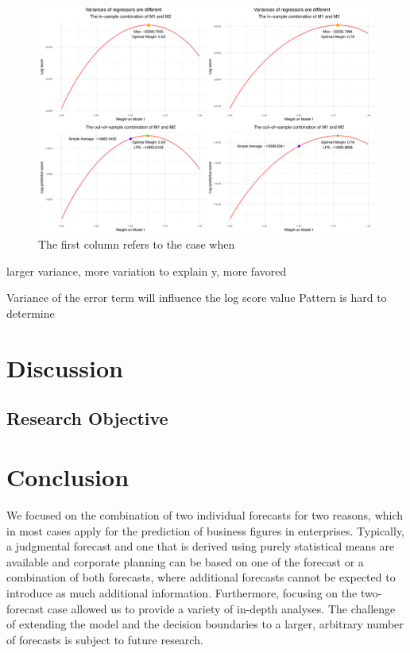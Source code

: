 \documentclass{monashthesis}
\begin{document}
\begin{figure}[ht]
\centering
\includegraphics[scale=0.35]{figures/x_var.png}
\caption{The first column refers to the case when }
\label{fig:xvar}
\end{figure}

larger variance, more variation to explain y, more favored

Variance of the error term will influence the log score value
Pattern is hard to determine

\hypertarget{discussion}{%
\chapter{Discussion}\label{discussion}}

\hypertarget{research-objective-1}{%
\section{Research Objective}\label{research-objective-1}}

\hypertarget{conclusion}{%
\chapter{Conclusion}\label{conclusion}}

We focused on the combination of two individual forecasts for two reasons, which in most cases apply for the prediction of business figures in enterprises. Typically, a judgmental forecast and one that is derived using purely statistical means are available and corporate planning can be based on one of the forecast or a combination of both forecasts, where additional forecasts cannot be expected to introduce as much additional information. Furthermore, focusing on the two-forecast case allowed us to provide a variety of in-depth analyses. The challenge of extending the model and the decision boundaries to a larger, arbitrary number of forecasts is subject to future research.
\end{document}
